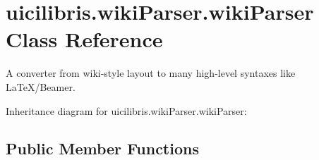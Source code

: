 \hypertarget{classuicilibris_1_1wikiParser_1_1wikiParser}{\section{uicilibris.\-wiki\-Parser.\-wiki\-Parser \-Class \-Reference}
\label{classuicilibris_1_1wikiParser_1_1wikiParser}
}


\-A converter from wiki-\/style layout to many high-\/level syntaxes like \-La\-Te\-X/\-Beamer.  




\-Inheritance diagram for uicilibris.\-wiki\-Parser.\-wiki\-Parser\-:
\subsection*{\-Public \-Member \-Functions}
